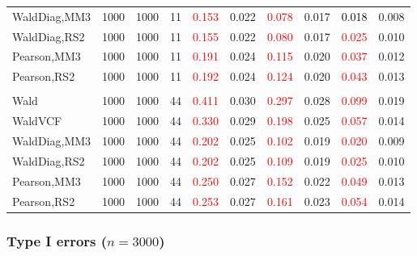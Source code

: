 \documentclass[
]{article}
\begin{document}
\begin{table}[H]
{\begin{tabular}[t]{lrrrrrrlrr}
\hspace{1em}WaldDiag,MM3 & 1000 & 1000 & 11 & \textcolor{red}{0.153} & 0.022 & \textcolor{red}{0.078} & 0.017 & \textcolor{black}{0.018} & 0.008\\
\hspace{1em}WaldDiag,RS2 & 1000 & 1000 & 11 & \textcolor{red}{0.155} & 0.022 & \textcolor{red}{0.080} & 0.017 & \textcolor{red}{0.025} & 0.010\\
\hspace{1em}Pearson,MM3 & 1000 & 1000 & 11 & \textcolor{red}{0.191} & 0.024 & \textcolor{red}{0.115} & 0.020 & \textcolor{red}{0.037} & 0.012\\
\hspace{1em}Pearson,RS2 & 1000 & 1000 & 11 & \textcolor{red}{0.192} & 0.024 & \textcolor{red}{0.124} & 0.020 & \textcolor{red}{0.043} & 0.013\\
\addlinespace[0.3em]
\multicolumn{10}{l}{\textbf{3F 15V}}\\
\hspace{1em}Wald & 1000 & 1000 & 44 & \textcolor{red}{0.411} & 0.030 & \textcolor{red}{0.297} & 0.028 & \textcolor{red}{0.099} & 0.019\\
\hspace{1em}WaldVCF & 1000 & 1000 & 44 & \textcolor{red}{0.330} & 0.029 & \textcolor{red}{0.198} & 0.025 & \textcolor{red}{0.057} & 0.014\\
\hspace{1em}WaldDiag,MM3 & 1000 & 1000 & 44 & \textcolor{red}{0.202} & 0.025 & \textcolor{red}{0.102} & 0.019 & \textcolor{red}{0.020} & 0.009\\
\hspace{1em}WaldDiag,RS2 & 1000 & 1000 & 44 & \textcolor{red}{0.202} & 0.025 & \textcolor{red}{0.109} & 0.019 & \textcolor{red}{0.025} & 0.010\\
\hspace{1em}Pearson,MM3 & 1000 & 1000 & 44 & \textcolor{red}{0.250} & 0.027 & \textcolor{red}{0.152} & 0.022 & \textcolor{red}{0.049} & 0.013\\
\hspace{1em}Pearson,RS2 & 1000 & 1000 & 44 & \textcolor{red}{0.253} & 0.027 & \textcolor{red}{0.161} & 0.023 & \textcolor{red}{0.054} & 0.014\\
\bottomrule
\end{tabular}}
\endgroup{}
\end{table}

\hypertarget{type-i-errors-n3000-1}{%
\subsubsection{\texorpdfstring{Type I errors
(\(n=3000\))}{Type I errors (n=3000)}}\label{type-i-errors-n3000-1}}
\end{document}
